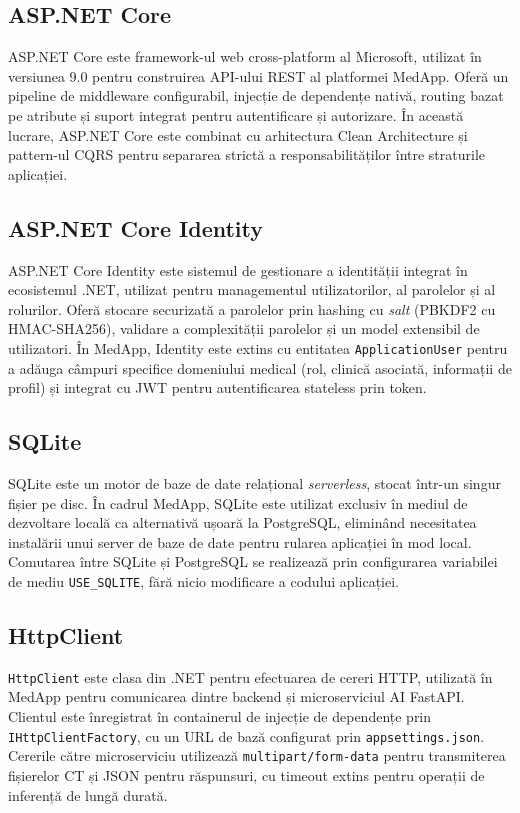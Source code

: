 \documentclass[12pt, a4paper]{report}
\begin{document}
\subsection{ASP.NET Core}

ASP.NET Core este framework-ul web cross-platform al Microsoft, utilizat
în versiunea 9.0 pentru construirea API-ului REST al platformei MedApp.
Oferă un pipeline de middleware configurabil, injecție de dependențe nativă,
routing bazat pe atribute și suport integrat pentru autentificare și autorizare.
În această lucrare, ASP.NET Core este combinat cu arhitectura Clean
Architecture și pattern-ul CQRS pentru separarea strictă a responsabilităților
între straturile aplicației.

\subsection{ASP.NET Core Identity}

ASP.NET Core Identity este sistemul de gestionare a identității integrat în
ecosistemul .NET, utilizat pentru managementul utilizatorilor, al parolelor
și al rolurilor. Oferă stocare securizată a parolelor prin hashing cu
\textit{salt} (PBKDF2 cu HMAC-SHA256), validare a complexității parolelor
și un model extensibil de utilizatori. În MedApp, Identity este extins cu
entitatea \texttt{ApplicationUser} pentru a adăuga câmpuri specifice domeniului
medical (rol, clinică asociată, informații de profil) și integrat cu JWT
pentru autentificarea stateless prin token.

\subsection{SQLite}

SQLite este un motor de baze de date relațional \textit{serverless}, stocat
într-un singur fișier pe disc. În cadrul MedApp, SQLite este utilizat exclusiv
în mediul de dezvoltare locală ca alternativă ușoară la PostgreSQL, eliminând
necesitatea instalării unui server de baze de date pentru rularea aplicației
în mod local. Comutarea între SQLite și PostgreSQL se realizează prin
configurarea variabilei de mediu \texttt{USE\_SQLITE}, fără nicio modificare
a codului aplicației.

\subsection{HttpClient}

\texttt{HttpClient} este clasa din .NET pentru efectuarea de cereri HTTP,
utilizată în MedApp pentru comunicarea dintre backend și microserviciul AI
FastAPI. Clientul este înregistrat în containerul de injecție de dependențe
prin \texttt{IHttpClientFactory}, cu un URL de bază configurat prin
\texttt{appsettings.json}. Cererile către microserviciu utilizează
\texttt{multipart/form-data} pentru transmiterea fișierelor CT și JSON
pentru răspunsuri, cu timeout extins pentru operații de inferență de lungă
durată.
\end{document}
